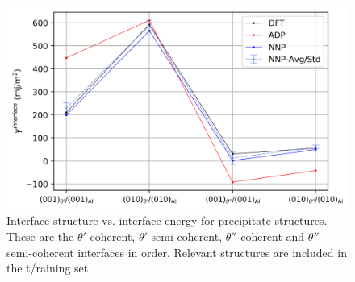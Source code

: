\documentclass{article}
\begin{document}
\begin{figure}[H]%
\centering%
\includegraphics[width=1\textwidth,center]{./figures/interface_energies.png}%
\caption{Interface structure vs. interface energy for precipitate structures. 
These are the $\theta'$ coherent, $\theta'$ semi-coherent, $\theta''$ coherent and $\theta''$ semi-coherent
interfaces in order. Relevant structures are included in the t/raining set.}%
\label{fig:interface_energies}
\end{figure}
\end{document}
